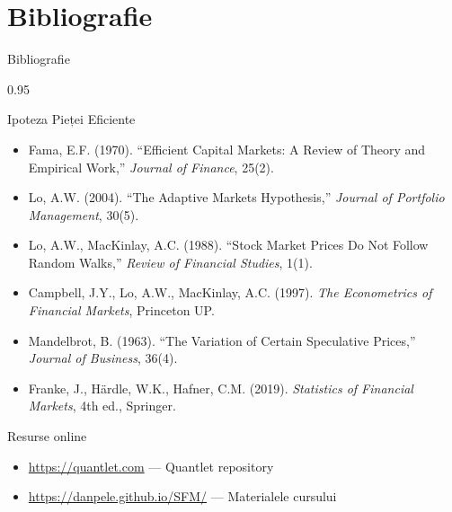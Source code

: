 \documentclass[9pt, aspectratio=169, t]{beamer}
\begin{document}
\section{Bibliografie}

\begin{frame}{Bibliografie}
    \begin{cminipage}{0.95\textwidth}
    \begin{block}{Ipoteza Pieței Eficiente}
        {\small
        \begin{itemize}\setlength{\itemsep}{0pt}
            \item Fama, E.F. (1970). ``Efficient Capital Markets: A Review of Theory and Empirical Work,'' \textit{Journal of Finance}, 25(2).
            \item Lo, A.W. (2004). ``The Adaptive Markets Hypothesis,'' \textit{Journal of Portfolio Management}, 30(5).
            \item Lo, A.W., MacKinlay, A.C. (1988). ``Stock Market Prices Do Not Follow Random Walks,'' \textit{Review of Financial Studies}, 1(1).
            \item Campbell, J.Y., Lo, A.W., MacKinlay, A.C. (1997). \textit{The Econometrics of Financial Markets}, Princeton UP.
            \item Mandelbrot, B. (1963). ``The Variation of Certain Speculative Prices,'' \textit{Journal of Business}, 36(4).
            \item Franke, J., H\"{a}rdle, W.K., Hafner, C.M. (2019). \textit{Statistics of Financial Markets}, 4th ed., Springer.
        \end{itemize}
        }
    \end{block}

    \begin{exampleblock}{Resurse online}
        {\small
        \begin{itemize}\setlength{\itemsep}{0pt}
            \item \url{https://quantlet.com} --- Quantlet repository
            \item \url{https://danpele.github.io/SFM/} --- Materialele cursului
        \end{itemize}
        }
    \end{exampleblock}
    \end{cminipage}
\end{frame}
\end{document}
